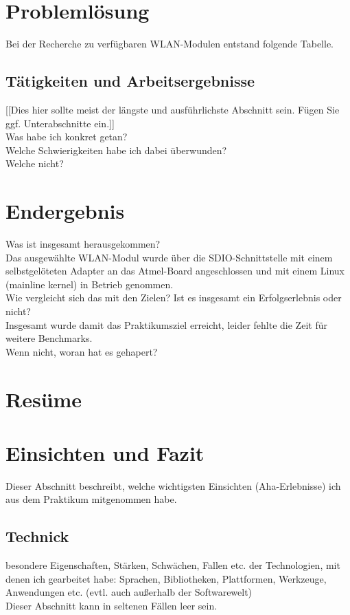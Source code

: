 \documentclass[pdftex,12pt,a4paper]{scrreprt}
\begin{document}
\section{Problemlösung}
Bei der Recherche zu verfügbaren WLAN-Modulen entstand folgende Tabelle.

\subsection{Tätigkeiten und Arbeitsergebnisse}
[[Dies hier sollte meist der längste und ausführlichste Abschnitt sein. Fügen Sie ggf.
Unterabschnitte ein.]]\\
Was habe ich konkret getan?\\
Welche Schwierigkeiten habe ich dabei überwunden?\\
Welche nicht?\\

\section{Endergebnis}
Was ist insgesamt herausgekommen?\\
Das ausgewählte WLAN-Modul wurde über die SDIO-Schnittstelle mit einem selbstgelöteten Adapter an das Atmel-Board angeschlossen und mit einem Linux (mainline kernel) in Betrieb genommen.\\
Wie vergleicht sich das mit den Zielen? Ist es insgesamt ein Erfolgserlebnis oder nicht?\\
Insgesamt wurde damit das Praktikumsziel erreicht, leider fehlte die Zeit für weitere Benchmarks.\\
Wenn nicht, woran hat es gehapert?\\
\section{Resüme}
\section{Einsichten und Fazit}
Dieser Abschnitt beschreibt, welche wichtigsten Einsichten (Aha-Erlebnisse) ich aus dem
Praktikum mitgenommen habe.

\subsection{Technick}
besondere Eigenschaften, Stärken, Schwächen, Fallen etc. der Technologien, mit denen
ich gearbeitet habe: Sprachen, Bibliotheken, Plattformen, Werkzeuge, Anwendungen etc.
(evtl. auch außerhalb der Softwarewelt)\\
Dieser Abschnitt kann in seltenen Fällen leer sein.
\end{document}
